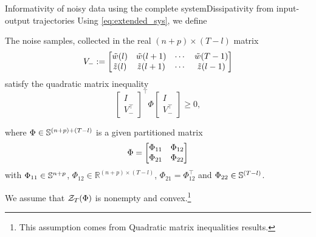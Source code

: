 \documentclass[aspectratio=169, handout, 10pt, hyperref=colorlinks]{beamer}
\begin{document}
\begin{frame}[allowframebreaks]{Informativity of noisy data using the complete system}{Dissipativity from input-output trajectories}
    Using \ref{eq:extended_sys}, we define
    \begin{definition} \label{ch5:assumption on noise samples}
    The noise samples,
    collected in the real $(n+p) \times (T-l)$ matrix  %
    $$
    V_- := \bbm \tilde{w}(l) & \tilde{w}(l+1) & \cdots & \tilde{w}(T-1) \\  \tilde{z}(l) & \tilde{z}(l+1)  & \cdots & \tilde{z}(l-1)    \ebm
    $$
    satisfy the quadratic matrix inequality
    \begin{equation} 
        \label{ch5:asnoise}
        \begin{bmatrix}
        I \\ V_-^\top 
        \end{bmatrix}^\top 
        \Phi
        \begin{bmatrix}
        I \\ V_-^\top 
        \end{bmatrix} \geq 0,
    \end{equation}
    \end{definition}
    \begin{definition}    
    where $\Phi \in \S{(n+p) + (T-l)}$ is a given partitioned matrix 
    \begin{equation} \label{ch5:eq:Phi}
    \Phi = \bbm \Phi_{11}  & \Phi_{12} \\ \Phi_{21} & \Phi_{22} \ebm
    \end{equation}
    with $\Phi_{11} \in \S{n+p}$, $\Phi_{12} \in \mathbb{R}^{(n+p) \times (T-l)}$, $\Phi_{21} = \Phi_{12}^\top$ and $\Phi_{22} \in \S{(T-l)}$.

    We assume that $\calZ_T(\Phi)$ is nonempty and convex.\footnote{\tiny{This assumption comes from Quadratic matrix inequalities results.}}


\end{definition}
\end{frame}
\end{document}

